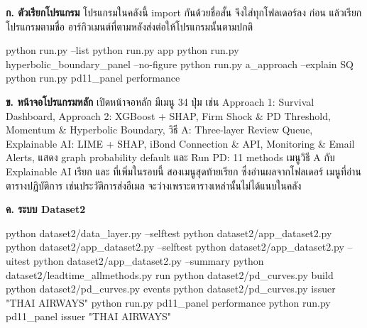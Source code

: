 \documentclass[12pt]{article}
\begin{document}
\textbf{ก. ตัวเรียกโปรแกรม } โปรแกรมในคลังนี้ import กันด้วยชื่อสั้น  จึงใส่ทุกโฟลเดอร์ลง  ก่อน แล้วเรียกโปรแกรมตามชื่อ อาร์กิวเมนต์ที่ตามหลังส่งต่อให้โปรแกรมนั้นตามปกติ

\begin{Cmd}
python run.py --list
python run.py app
python run.py hyperbolic_boundary_panel --no-figure
python run.py a_approach --explain SQ
python run.py pd11_panel performance
\end{Cmd}

\textbf{ข. หน้าจอโปรแกรมหลัก}  เปิดหน้าจอหลัก มีเมนู 34 ปุ่ม เช่น Approach 1: Survival Dashboard, Approach 2: XGBoost + SHAP, Firm Shock \& PD Threshold, Momentum \& Hyperbolic Boundary, วิธี A: Three-layer Review Queue, Explainable AI: LIME + SHAP, iBond Connection \& API, Monitoring \& Email Alerts, แสดง graph probability default และ Run PD: 11 methods เมนูวิธี A กับ Explainable AI เรียก  และ  ที่เพิ่มในรอบนี้ สองเมนูสุดท้ายเรียก  ซึ่งอ่านผลจากโฟลเดอร์  เมนูที่อ่านตารางปฏิบัติการ เช่นประวัติการส่งอีเมล จะว่างเพราะตารางเหล่านั้นไม่ได้แนบในคลัง

\textbf{ค. ระบบ Dataset2}

\begin{Cmd}
python dataset2/data_layer.py --selftest
python dataset2/app_dataset2.py
python dataset2/app_dataset2.py --selftest
python dataset2/app_dataset2.py --uitest
python dataset2/app_dataset2.py --summary
python dataset2/leadtime_allmethods.py run
python dataset2/pd_curves.py build
python dataset2/pd_curves.py events
python dataset2/pd_curves.py issuer "THAI AIRWAYS"
python run.py pd11_panel performance
python run.py pd11_panel issuer "THAI AIRWAYS"
\end{Cmd}
\end{document}
